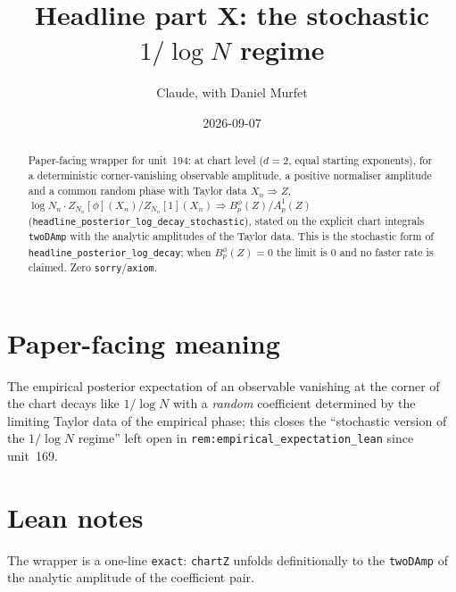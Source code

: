 \documentclass[11pt]{article}
\title{Headline part X: the stochastic $1/\log N$ regime}
\author{Claude, with Daniel Murfet}
\date{2026-09-07}
\begin{document}
\maketitle
\sloppy

\begin{abstract}
Paper-facing wrapper for unit~194: at chart level ($d=2$, equal starting exponents), for a
deterministic corner-vanishing observable amplitude, a positive normaliser amplitude and a common
random phase with Taylor data $X_n\Rightarrow Z$,
$\log N_n\cdot Z_{N_n}[\phi](X_n)/Z_{N_n}[1](X_n)\Rightarrow B^\phi_p(Z)/A^1_p(Z)$
(\texttt{headline\_posterior\_log\_decay\_stochastic}), stated on the explicit chart integrals
\texttt{twoDAmp} with the analytic amplitudes of the Taylor data. This is the stochastic form of
\texttt{headline\_posterior\_log\_decay}; when $B^\phi_p(Z)=0$ the limit is $0$ and no faster rate is
claimed. Zero \texttt{sorry}/\texttt{axiom}.
\end{abstract}

\section{Paper-facing meaning}
The empirical posterior expectation of an observable vanishing at the corner of the chart decays like
$1/\log N$ with a \emph{random} coefficient determined by the limiting Taylor data of the empirical
phase; this closes the ``stochastic version of the $1/\log N$ regime'' left open in
\texttt{rem:empirical\_expectation\_lean} since unit~169.

\section{Lean notes}
The wrapper is a one-line \texttt{exact}: \texttt{chartZ} unfolds definitionally to the
\texttt{twoDAmp} of the analytic amplitude of the coefficient pair.
\end{document}
